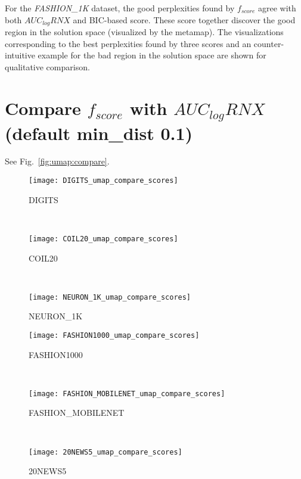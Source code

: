 For the \emph{FASHION\_1K} dataset, the good perplexities found by $f_{score}$ agree with both $AUC_{log}RNX$ and BIC-based score.
These score together discover the good region in the solution space (visualized by the metamap).
The visualizations corresponding to the best perplexities found by three scores
and an counter-intuitive example for the bad region in the solution space are shown for qualitative comparison.


\section{Compare $f_{score}$ with $AUC_{log}RNX$ (default min\_dist 0.1)}
See Fig.~\ref{fig:umap:compare}.

\begin{figure*}%
    \centering
    \begin{subfigure}[b]{0.32\textwidth}
        \centering
        \texttt{[image: DIGITS\_umap\_compare\_scores]}
        \caption{DIGITS}
    \end{subfigure}
    ~
    \begin{subfigure}[b]{0.32\textwidth}
        \texttt{[image: COIL20\_umap\_compare\_scores]}
        \caption{COIL20}
    \end{subfigure}
    ~
    \begin{subfigure}[b]{0.32\textwidth}
        \texttt{[image: NEURON\_1K\_umap\_compare\_scores]}
        \caption{NEURON\_1K}
    \end{subfigure}
    \vfill
    \begin{subfigure}[b]{0.32\textwidth}
        \centering
        \texttt{[image: FASHION1000\_umap\_compare\_scores]}
        \caption{FASHION1000}
    \end{subfigure}
    ~
    \begin{subfigure}[b]{0.32\textwidth}
        \texttt{[image: FASHION\_MOBILENET\_umap\_compare\_scores]}
        \caption{FASHION\_MOBILENET}
    \end{subfigure}
    ~
    \begin{subfigure}[b]{0.32\textwidth}
        \texttt{[image: 20NEWS5\_umap\_compare\_scores]}
        \caption{20NEWS5}
    \end{subfigure}
    \caption{Comparing constraint score and $AUC_{log}RNX$ score for the embeddings of UMAP with fixed \texttt{min\_dist=0.1}.}
    \label{fig:umap:compare}
\end{figure*}



